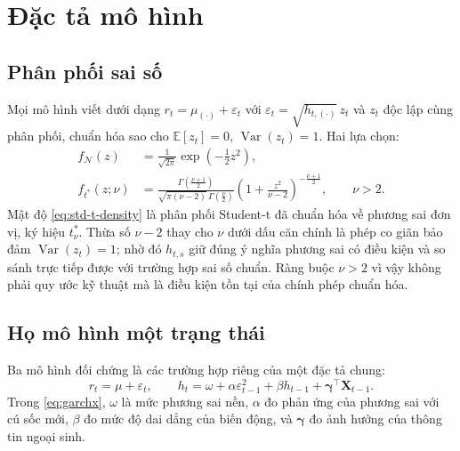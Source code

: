 \documentclass[12pt,a4paper]{article}
\numberwithin{equation}{section}
\theoremstyle{definition}
\newcommand{\E}{\mathbb{E}}
\newcommand{\Var}{\operatorname{Var}}
\newcommand{\Xvec}{\symbf{X}}
\newcommand{\bmgamma}{\symbf{\gamma}}
\begin{document}
\section{Đặc tả mô hình}\label{sec:models}

\subsection{Phân phối sai số}\label{subsec:errors}
Mọi mô hình viết dưới dạng $r_t=\mu_{(\cdot)}+\varepsilon_t$ với
$\varepsilon_t=\sqrt{h_{t,(\cdot)}}\,z_t$ và $z_t$ độc lập cùng phân phối, chuẩn hóa sao
cho $\E[z_t]=0$, $\Var(z_t)=1$. Hai lựa chọn:
\begin{align}
  f_{\mathcal{N}}(z) &= \frac{1}{\sqrt{2\pi}}\exp\!\left(-\tfrac{1}{2}z^{2}\right),
  \label{eq:normal-density}\\[0.2em]
  f_{t^{*}}(z;\nu) &= \frac{\Gamma\!\left(\frac{\nu+1}{2}\right)}
  {\sqrt{\pi(\nu-2)}\,\Gamma\!\left(\frac{\nu}{2}\right)}
  \left(1+\frac{z^{2}}{\nu-2}\right)^{-\frac{\nu+1}{2}},\qquad \nu>2.
  \label{eq:std-t-density}
\end{align}
Mật độ \eqref{eq:std-t-density} là phân phối Student-t đã chuẩn hóa về phương sai đơn vị,
ký hiệu $t^{*}_{\nu}$. Thừa số $\nu-2$ thay cho $\nu$ dưới dấu căn chính là phép co giãn
bảo đảm $\Var(z_t)=1$; nhờ đó $h_{t,s}$ giữ đúng ý nghĩa phương sai có điều kiện và so
sánh trực tiếp được với trường hợp sai số chuẩn. Ràng buộc $\nu>2$ vì vậy không phải quy
ước kỹ thuật mà là điều kiện tồn tại của chính phép chuẩn hóa.

\subsection{Họ mô hình một trạng thái}\label{subsec:single-regime}
Ba mô hình đối chứng là các trường hợp riêng của một đặc tả chung:
\begin{equation}
  r_t=\mu+\varepsilon_t,\qquad
  h_t=\omega+\alpha\varepsilon_{t-1}^{2}+\beta h_{t-1}+\bmgamma^{\top}\Xvec_{t-1}.
  \label{eq:garchx}
\end{equation}
Trong \eqref{eq:garchx}, $\omega$ là mức phương sai nền, $\alpha$ đo phản ứng của phương
sai với cú sốc mới, $\beta$ đo mức độ dai dẳng của biến động, và $\bmgamma$ đo ảnh hưởng
của thông tin ngoại sinh.
\end{document}
